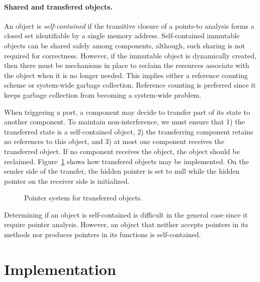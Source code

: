 \documentclass[letterpaper]{article}
\theoremstyle{definition} \newtheorem{constraint}{Constraint}
\begin{document}
\paragraph{Shared and transfered objects.}
An object is \emph{self-contained} if the transitive closure of a points-to analysis forms a closed set identifiable by a single memory address.
Self-contained immutable objects can be shared safely among components, although, such sharing is not required for correctness.
However, if the immutable object is dynamically created, then there must be mechanisms in place to reclaim the resources associate with the object when it is no longer needed.
This implies either a reference counting scheme or system-wide garbage collection.
Reference counting is preferred since it keeps garbage collection from becoming a system-wide problem.

When triggering a port, a component may decide to transfer part of its state to another component.
To maintain non-interference, we must ensure that 1) the transferred state is a self-contained object, 2) the transferring component retains no references to this object, and 3) at most one component receives the transferred object.
If no component receives the object, the object should be reclaimed.
Figure~\ref{pointer} shows how transfered objects may be implemented.
On the sender side of the transfer, the hidden pointer is set to null while the hidden pointer on the receiver side is initialized.

\begin{figure}
{

\centerline{\box\graph}
}
\caption{Pointer system for transferred objects.\label{pointer}}
\end{figure}

Determining if an object is self-contained is difficult in the general case since it require pointer analysis.
However, an object that neither accepts pointers in its methods nor produces pointers in its functions is self-contained.

\section{Implementation\label{design}}
\end{document}
